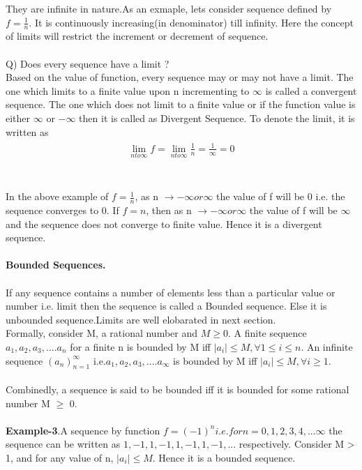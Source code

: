 \documentclass[a4paper]{article}
\begin{document}
They are infinite in nature.As an exmaple, lets consider sequence defined by $f=\frac{1}{n}$. It is continuously increasing(in denominator) till infinity. Here the concept of limits will restrict the increment or decrement of sequence.
\\
\\
Q) Does every sequence have a limit ?\\
Based on the value of function,  every sequence may or may not have a limit. The one which limits to a finite value upon n incrementing to $\infty$ is called a convergent sequence. The one which does not limit to a finite value or if the function value is either $\infty$ or $-\infty$ then it is called as Divergent Sequence. To denote the limit, it is written as
\\
\begin{align}
\begin{split}
\lim_{n to \infty} f= \lim_{n to \infty} \frac{1}{n} = \frac{1}{\infty} = 0
\end{split}
\end{align}
\\
\\
In the above example of $f=\frac{1}{n}$, as n $\to -\infty or \infty$ the value of f will be 0 i.e. the sequence converges to 0. If $f={n}$, then as n $\to -\infty or \infty$ the value of f will be $\infty$ and the sequence does not converge to finite value. Hence it is a divergent sequence. 
\\
\\
\textbf{Bounded Sequences.}
\\
\\
If any sequence contains a number of elements less than a particular value or number i.e. limit then the sequence is called a Bounded sequence. Else it is unbounded sequence.Limits are well elobarated in next section. \\
Formally, consider M, a rational number and $M\geq0$. A finite sequence $a_1,a_2,a_3,....a_n$ for a finite n is bounded by M iff $\mid a_i \mid \leq M , \forall 1 \leq i \leq n$. 
 An infinite sequence $(a_n)^{\infty}_{n=1}$ i.e.$a_1,a_2,a_3,....a_\infty$ is bounded by M iff $\mid a_i \mid \leq M , \forall i \geq 1$. \\
 \\
Combinedly, a sequence is said to be bounded iff it is bounded for some rational number M $\geq$ 0.
\\
\\
\textbf{Example-3}.A sequence by function $f=(-1)^n i.e. for n=0, 1 ,2,3,4,...\infty$ the sequence can be written as $1,-1,1,-1,1,-1,1,-1,...$ respectively. Consider M > 1, and for any value of n, $\mid a_i \mid \leq M $. Hence it is a bounded sequence.
\end{document}
